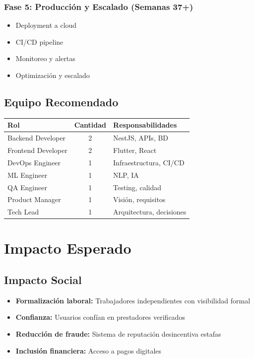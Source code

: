 \documentclass[12pt,a4paper,spanish]{article}
\begin{document}
\subsubsection{Fase 5: Producción y Escalado (Semanas 37+)}

\begin{itemize}
    \item Deployment a cloud
    \item CI/CD pipeline
    \item Monitoreo y alertas
    \item Optimización y escalado
\end{itemize}

\subsection{Equipo Recomendado}

\begin{center}
\begin{tabular}{|l|c|p{5cm}|}
    \toprule
    \textbf{Rol} & \textbf{Cantidad} & \textbf{Responsabilidades} \\
    \midrule
    Backend Developer & 2 & NestJS, APIs, BD \\
    Frontend Developer & 2 & Flutter, React \\
    DevOps Engineer & 1 & Infraestructura, CI/CD \\
    ML Engineer & 1 & NLP, IA \\
    QA Engineer & 1 & Testing, calidad \\
    Product Manager & 1 & Visión, requisitos \\
    Tech Lead & 1 & Arquitectura, decisiones \\
    \bottomrule
\end{tabular}
\end{center}

\newpage

\section{Impacto Esperado}

\subsection{Impacto Social}

\begin{itemize}
    \item \textbf{Formalización laboral:} Trabajadores independientes con visibilidad formal
    \item \textbf{Confianza:} Usuarios confían en prestadores verificados
    \item \textbf{Reducción de fraude:} Sistema de reputación desincentiva estafas
    \item \textbf{Inclusión financiera:} Acceso a pagos digitales
\end{itemize}
\end{document}
